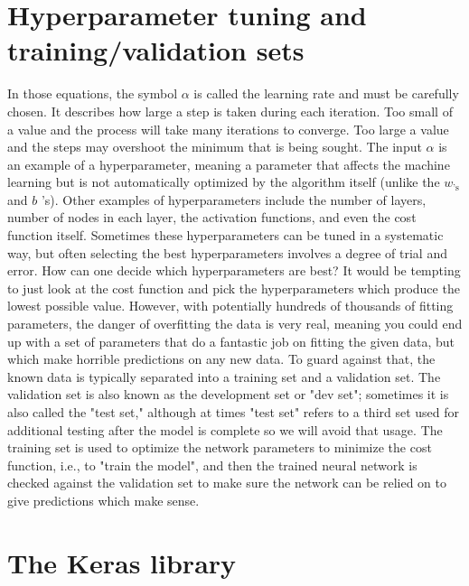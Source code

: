 \section*{Hyperparameter tuning and training/validation sets}
In those equations, the symbol $\alpha$ is called the learning rate and must be carefully chosen. It describes how large a step is taken during each iteration. Too small of a value and the process will take many iterations to converge. Too large a value and the steps may overshoot the minimum that is being sought. The input $\alpha$ is an example of a hyperparameter, meaning a parameter that affects the machine learning but is not automatically optimized by the algorithm itself (unlike the $w_{\text {'s }}$ and $b$ 's). Other examples of hyperparameters include the number of layers, number of nodes in each layer, the activation functions, and even the cost function itself. Sometimes these hyperparameters can be tuned in a systematic way, but often selecting the best hyperparameters involves a degree of trial and error.
How can one decide which hyperparameters are best? It would be tempting to just look at the cost function and pick the hyperparameters which produce the lowest possible value. However, with potentially hundreds of thousands of fitting parameters, the danger of overfitting the data is very real, meaning you could end up with a set of parameters that do a fantastic job on fitting the given data, but which make horrible predictions on any new data. To guard against that, the known data is typically separated into a training set and a validation set. The validation set is also known as the development set or "dev set"; sometimes it is also called the "test set," although at times "test set" refers to a third set used  for additional testing after the model is complete so we will avoid that usage. The training set is used to optimize the network parameters to minimize the cost function, i.e., to "train the model", and then the trained neural network is checked against the validation set to make sure the network can be relied on to give predictions which make sense.

\section*{The Keras library}

